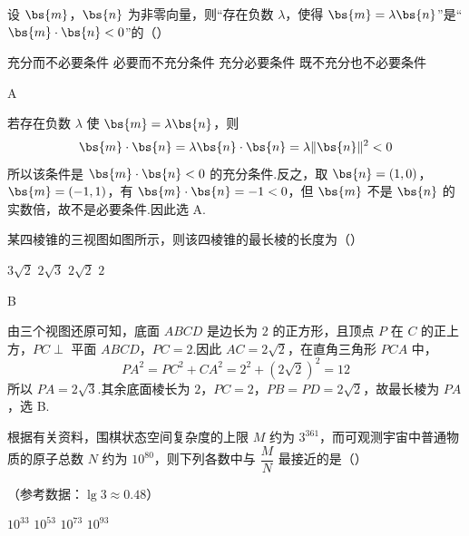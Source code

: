 \begin{problem}
设 \(\bs{m}\)，\(\bs{n}\) 为非零向量，则“存在负数 \(\lambda\)，使得 \(\bs{m}=\lambda\bs{n}\)”是“\(\bs{m}\cdot \bs{n}<0\)”的（\quad）

\choices
    {充分而不必要条件}
    {必要而不充分条件}
    {充分必要条件}
    {既不充分也不必要条件}
\end{problem}

\begin{answer}
A
\end{answer}

\begin{solution}
若存在负数 \(\lambda\) 使 \(\bs{m}=\lambda\bs{n}\)，则
\[
\bs{m}\cdot\bs{n}=\lambda\bs{n}\cdot\bs{n}=\lambda\lVert\bs{n}\rVert^2<0
\]
所以该条件是 \(\bs{m}\cdot\bs{n}<0\) 的充分条件.反之，取 \(\bs{n}=(1,0)\)，\(\bs{m}=(-1,1)\)，有 \(\bs{m}\cdot\bs{n}=-1<0\)，但 \(\bs{m}\) 不是 \(\bs{n}\) 的实数倍，故不是必要条件.因此选 A.
\end{solution}

\begin{problem}
某四棱锥的三视图如图所示，则该四棱锥的最长棱的长度为（\quad）


\choices
    {\(3\sqrt2\)}
    {\(2\sqrt3\)}
    {\(2\sqrt2\)}
    {\(2\)}
\end{problem}

\begin{answer}
B
\end{answer}

\begin{solution}
由三个视图还原可知，底面 \(ABCD\) 是边长为 \(2\) 的正方形，且顶点 \(P\) 在 \(C\) 的正上方，\(PC\perp\) 平面 \(ABCD\)，\(PC=2\).因此 \(AC=2\sqrt2\)，在直角三角形 \(PCA\) 中，
\[
PA^2=PC^2+CA^2=2^2+(2\sqrt2)^2=12
\]
所以 \(PA=2\sqrt3\).其余底面棱长为 \(2\)，\(PC=2\)，\(PB=PD=2\sqrt2\)，故最长棱为 \(PA\)，选 B.
\end{solution}

\begin{problem}
根据有关资料，围棋状态空间复杂度的上限 \(M\) 约为 \(3^{361}\)，而可观测宇宙中普通物质的原子总数 \(N\) 约为 \(10^{80}\)，则下列各数中与 \(\dfrac{M}{N}\) 最接近的是（\quad）

（参考数据：\(\lg 3\approx 0.48\)）

\choices
    {\(10^{33}\)}
    {\(10^{53}\)}
    {\(10^{73}\)}
    {\(10^{93}\)}
\end{problem}

